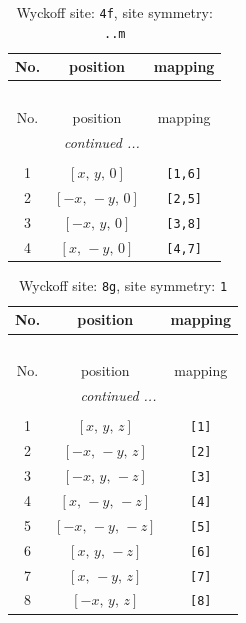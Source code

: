 \documentclass[fleqn,8pt]{jsarticle}
\begin{document}
\begin{longtable}{ccc}
\caption{Wyckoff site: {\tt 4f}, site symmetry: {\tt ..m}}
 \\
 \hline \hline
No. & position & mapping \\ \hline \endfirsthead

\multicolumn{2}{l}{\tablename\ \thetable{}} \\
 \hline \hline
No. & position & mapping \\ \hline \endhead

 \hline \hline
\multicolumn{2}{r}{\footnotesize\it continued ...} \\ \endfoot

 \hline \hline
\multicolumn{2}{r}{} \\ \endlastfoot

1 & $\left[ x,\, y,\, 0 \right]$ & {\tt [1,6]} \\ \hline
2 & $\left[ - x,\, - y,\, 0 \right]$ & {\tt [2,5]} \\ \hline
3 & $\left[ - x,\, y,\, 0 \right]$ & {\tt [3,8]} \\ \hline
4 & $\left[ x,\, - y,\, 0 \right]$ & {\tt [4,7]} \\
\end{longtable}
\renewcommand{\arraystretch}{1.2}
\begin{longtable}{ccc}
\caption{Wyckoff site: {\tt 8g}, site symmetry: {\tt 1}}
 \\
 \hline \hline
No. & position & mapping \\ \hline \endfirsthead

\multicolumn{2}{l}{\tablename\ \thetable{}} \\
 \hline \hline
No. & position & mapping \\ \hline \endhead

 \hline \hline
\multicolumn{2}{r}{\footnotesize\it continued ...} \\ \endfoot

 \hline \hline
\multicolumn{2}{r}{} \\ \endlastfoot

1 & $\left[ x,\, y,\, z \right]$ & {\tt [1]} \\ \hline
2 & $\left[ - x,\, - y,\, z \right]$ & {\tt [2]} \\ \hline
3 & $\left[ - x,\, y,\, - z \right]$ & {\tt [3]} \\ \hline
4 & $\left[ x,\, - y,\, - z \right]$ & {\tt [4]} \\ \hline
5 & $\left[ - x,\, - y,\, - z \right]$ & {\tt [5]} \\ \hline
6 & $\left[ x,\, y,\, - z \right]$ & {\tt [6]} \\ \hline
7 & $\left[ x,\, - y,\, z \right]$ & {\tt [7]} \\ \hline
8 & $\left[ - x,\, y,\, z \right]$ & {\tt [8]} \\
\end{longtable}
\end{document}
